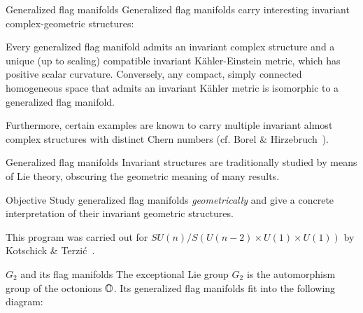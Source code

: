 \documentclass[11pt,parskip]{beamer}
\begin{document}
\begin{frame}{Generalized flag manifolds}
	Generalized flag manifolds carry interesting invariant complex-geometric structures:\pause
	\bigskip
	
	\begin{thm}
		Every generalized flag manifold admits an invariant complex structure and a unique (up to scaling) compatible invariant K\"ahler-Einstein metric, which has positive scalar curvature. Conversely, any compact, simply connected homogeneous space that admits an invariant K\"ahler metric is isomorphic to a generalized flag manifold.
	\end{thm}\pause
	\bigskip
	
	Furthermore, certain examples are known to carry multiple invariant almost complex structures with distinct Chern numbers (cf. Borel \& Hirzebruch~\cite{BH1958a}).
\end{frame}

\begin{frame}{Generalized flag manifolds}
	Invariant structures are traditionally studied by means of Lie theory, obscuring the geometric meaning of many results.\pause 
	\bigskip
	
	\begin{alertblock}{Objective}
		Study generalized flag manifolds \emph{geometrically} and give a concrete interpretation of their invariant geometric structures.
	\end{alertblock}\pause
	\bigskip
	
	This program was carried out for $SU(n)/S(U(n-2)\times U(1)\times U(1))$ by Kotschick \& Terzi\'c~\cite{KT2009}.
\end{frame}

\begin{frame}[fragile]{$G_2$ and its flag manifolds}
	The exceptional Lie group $G_2$ is the automorphism group of the octonions $\mathbb{O}$. Its generalized flag manifolds fit into the following diagram: \pause
	\begin{figure}\centering
	\end{figure}
\end{frame}
\end{document}
